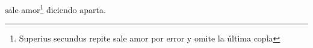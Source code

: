 sale amor\footnote{\textsuperscript{}Superius secundus repite sale amor por error y omite la última copla} diciendo aparta.
